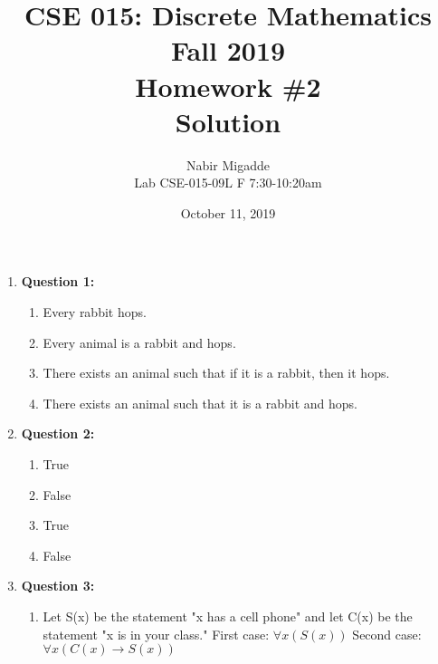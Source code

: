 \documentclass[11pt]{article}
\begin{document}
\author{Nabir Migadde\\
Lab CSE-015-09L F 7:30-10:20am}

\title{CSE 015: Discrete Mathematics\\
Fall 2019\\
Homework \#2\\
Solution}

\date{October 11, 2019}
\maketitle

\begin{enumerate}

\item
\textbf{Question 1:}

\begin{enumerate}[label=(\alph*)]
\item
Every rabbit hops.

\item
Every animal is a rabbit and hops.

\item
There exists an animal such that if it is a rabbit, then it hops.

\item
There exists an animal such that it is a rabbit and hops. 

\end{enumerate}

\item
\textbf{Question 2:}

\begin{enumerate}[label=(\alph*)]
\item
True

\item
False

\item
True

\item
False

\end{enumerate}

\item
\textbf{Question 3:}

\begin{enumerate}[label=(\alph*)]
 \item
 Let S(x) be the statement "x has a cell phone" and let C(x) be the statement "x is in your class." First case: $\forall x (S(x))$ Second case: $\forall x(C(x) \rightarrow S(x))$
 

\end{enumerate}
\end{enumerate}
\end{document}
